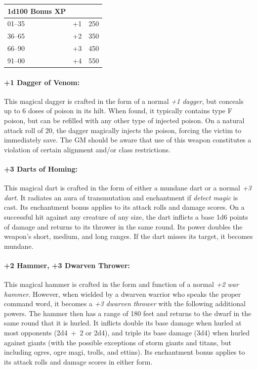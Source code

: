 \begin{multicols}{2}
\noindent \begin{tabular}{|p{}|p{}|p{}|}
\hline
1d100	Bonus	XP \\
\hline\hline
\rowcolor[gray]{0.9}01--35	& +1	& 250 \\
36--65	& +2	& 350 \\
\rowcolor[gray]{0.9}66--90	& +3	& 450 \\
91--00	& +4	& 550 \\
\hline
\end{tabular}

\paragraph{+1 Dagger of Venom:} This magical dagger is crafted in the form of a normal \textit{+1 dagger}, but conceals up to 6 doses of poison in its hilt.  When found, it typically contains type F poison, but can be refilled with any other type of injected poison.  On a natural attack roll of 20, the dagger magically injects the poison, forcing the victim to immediately save.  The GM should be aware that use of this weapon constitutes a violation of certain alignment and/or class restrictions.

\paragraph{+3 Darts of Homing:} This magical dart is crafted in the form of either a mundane dart or a normal \textit{+3 dart}.  It radiates an aura of transmutation and enchantment if \textit{detect magic} is cast.  Its enchantment bonus applies to its attack rolls and damage scores.  On a successful hit against any creature of any size, the dart inflicts a base 1d6 points of damage and returns to its thrower in the same round.  Its power doubles the weapon's short, medium, and long ranges.  If the dart misses its target, it becomes mundane.

\paragraph{+2 Hammer, +3 Dwarven Thrower:} This magical hammer is crafted in the form and function of a normal \textit{+2 war hammer}.  However, when wielded by a dwarven warrior who speaks the proper command word, it becomes a \textit{+3 dwarven thrower} with the following additional powers.  The hammer then has a range of 180 feet and returns to the dwarf in the same round that it is hurled.  It inflicts double its base damage when hurled at most opponents (2d4~+~2 or 2d4), and triple its base damage (3d4) when hurled against giants (with the possible exceptions of storm giants and titans, but including ogres, ogre magi, trolls, and ettins).  Its enchantment bonus applies to its attack rolls and damage scores in either form.  


\end{multicols}

